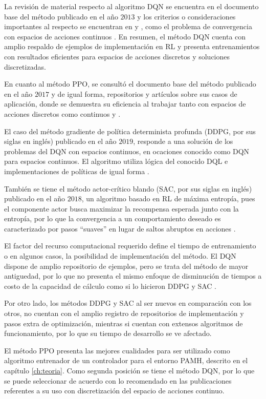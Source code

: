 La revisión de material respecto al algoritmo DQN se encuentra en el documento base del método \cite{DQNbase} publicado en el año $2013$ y los criterios o consideraciones importantes al respecto se encuentran en \cite{DQNexplained} y \cite{PytorchDQN}, como el problema de convergencia con espacios de acciones continuos \cite{ForoDQN}. En resumen, el método DQN cuenta con amplio respaldo de ejemplos de implementación en RL y presenta entrenamientos con resultados eficientes para espacios de acciones discretos y soluciones discretizadas.

En cuanto al método PPO, se consultó el documento base del método \cite{PPObase} publicado en el año $2017$ y de igual forma, repositorios y artículos sobre sus casos de aplicación, donde se demuestra su eficiencia al trabajar tanto con espacios de acciones discretos como continuos \cite{PPOyu} y \cite{PPOcoding2}.

El caso del método gradiente de política determinista profunda (DDPG, por sus siglas en inglés) publicado en el año $2019$, responde a una solución de los problemas del DQN con espacios continuos, en ocaciones conocido como DQN para espacios continuos. El algoritmo utiliza lógica del conocido DQL e implementaciones de políticas de igual forma \cite{DDPGbase}.

También se tiene el método actor-crítico blando (SAC, por sus siglas en inglés) publicado en el año $2018$, un algoritmo basado en RL de máxima entropía, pues el componente actor busca maximizar la recompensa esperada junto con la entropía, por lo que la convergencia a un comportamiento deseado es caracterizado por pasos ``suaves'' en lugar de saltos abruptos en acciones \cite{SACbase}.

El factor del recurso computacional requerido define el tiempo de entrenamiento o en algunos casos, la posibilidad de implementación del método. El DQN dispone de amplio repositorio de ejemplos, pero se trata del método de mayor antiguedad, por lo que no presenta el mismo enfoque de disminución de tiempos a costo de la capacidad de cálculo como si lo hicieron DDPG y SAC \cite{DDPGbase} \cite{SACbase}.

Por otro lado, los métodos DDPG y SAC al ser nuevos en comparación con los otros, no cuentan con el amplio registro de repositorios de implementación y pasos extra de optimización, mientras si cuentan con extensos algoritmos de funcionamiento, por lo que su tiempo de desarrollo se ve afectado.

El método PPO presenta las mejores cualidades para ser utilizado como algoritmo entrenador de un controlador para el entorno PAMH, descrito en el capítulo \ref{ch:teoria}. Como segunda posición se tiene el método DQN, por lo que se puede seleccionar de acuerdo con lo recomendado en las publicaciones referentes a su uso con discretización del espacio de acciones continuo.

